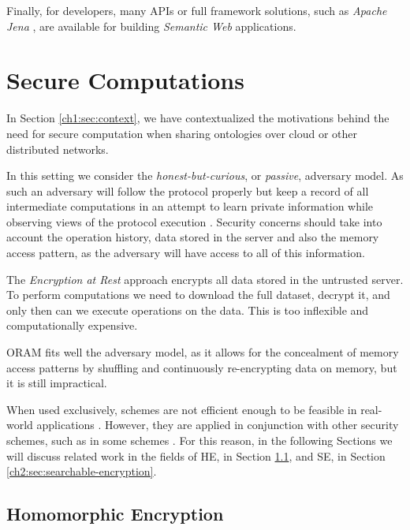 Finally, for developers, many \gls{API}s \autocite{Owlcs_undated-im} or full framework solutions, such as \emph{Apache Jena} \autocite{The_Apache_Software_Foundation_undated-wk}, are available for building \emph{Semantic Web} applications.




\section{Secure Computations}
\label{ch2:sec:secure-computations}
In Section \ref{ch1:sec:context}, we have contextualized the motivations behind the need for secure computation when sharing ontologies over cloud or other distributed networks.

In this setting we consider the \emph{honest-but-curious}, or \emph{passive}, adversary model. As such an adversary will follow the protocol properly but keep a record of all intermediate computations \autocite{Goldreich2001-sr} in an attempt to learn private information while observing views of the protocol execution \autocite{Evans2018-it}. Security concerns should take into account the operation history, data stored in the server and also the memory access pattern, as the adversary will have access to all of this information.

The \emph{Encryption at Rest} approach encrypts all data stored in the untrusted server. To perform computations we need to download the full dataset, decrypt it, and only then can we execute operations on the data. This is too inflexible and computationally expensive. 

\gls{ORAM} \autocite{Goldreich1996-yb} fits well the adversary model, as it allows for the concealment of memory access patterns by shuffling and continuously re-encrypting data on memory, but it is still impractical.

When used exclusively,  \autocite{Acar2018-mp, Fontaine2007-sv} schemes are not efficient enough to be feasible in real-world applications \autocite{Bosch2014-eb}. However, they are applied in conjunction with other security schemes, such as in some  schemes \autocite{Bosch2014-eb, Chase2010-xx}. For this reason, in the following Sections we will discuss related work in the fields of \gls{HE}, in Section \ref{ch2:sec:homomorphic-encryption}, and \gls{SE}, in Section \ref{ch2:sec:searchable-encryption}.


\subsection{Homomorphic Encryption}
\label{ch2:sec:homomorphic-encryption}

